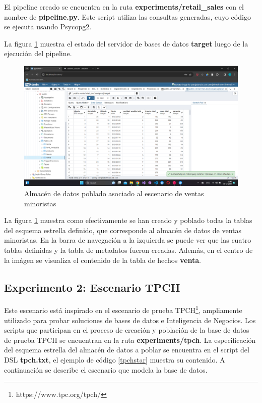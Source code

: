El pipeline creado se encuentra en la ruta \textbf{experiments/retail\_sales} con el nombre de 
\textbf{pipeline.py}. Este script utiliza las consultas generadas, cuyo código se ejecuta usando 
Psycopg2.

La figura \ref{fig:fullpg1} muestra el estado del servidor de bases de datos \textbf{target} luego de la ejecución 
del pipeline. 

\begin{figure}[H]
  \centering
  \includegraphics[scale=0.4]{Graphics/fullpgadmin1.png}
  \caption{Almacén de datos poblado asociado al escenario de ventas minoristas}
  \label{fig:fullpg1}
\end{figure}

La figura \ref{fig:fullpg1} muestra como efectivamente 
se han creado y poblado todas la tablas del esquema estrella definido, que corresponde al almacén de datos de ventas minoristas.
En la barra de navegaci\'on 
a la izquierda se puede ver que las cuatro tablas definidas y la tabla de metadatos fueron creadas. Además, en 
el centro de la im\'agen se visualiza el contenido de la tabla de hechos \textbf{venta}. 




\subsection{Experimento 2: Escenario TPCH}

Este escenario est\'a inspirado en el escenario de prueba TPCH\footnote{https://www.tpc.org/tpch/}, ampliamente 
utilizado para probar soluciones de bases de datos e Inteligencia de Negocios. Los scripts que participan 
en el proceso de creación y población de la base de datos de prueba TPCH se encuentran en la ruta 
\textbf{experiments/tpch}. La especificación del esquema estrella del almacén de datos a poblar se encuentra 
en el script del DSL \textbf{tpch.txt}, el ejemplo de código \ref{tpchstar} muestra su contenido.  A continuación se describe el escenario que modela la base de datos.

